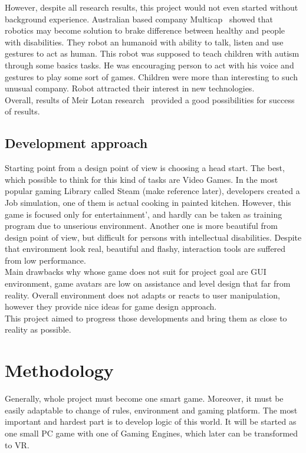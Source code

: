 \documentclass[18pt]{article}
\numberwithin{equation}{section} %
\numberwithin{figure}{section} %
\numberwithin{table}{section} %
\begin{document}
		However, despite all research results, this project would not even started without background experience. Australian based company Multicap~\cite{Multicap} showed that robotics may become solution to brake difference between healthy and people with disabilities. They robot an humanoid with ability to talk, listen and use gestures to act as human. This robot was supposed to teach children with autism through some basics tasks. He was encouraging person to act with his voice and gestures to play some sort of games. Children were more than interesting to such unusual company. Robot attracted their interest in new technologies. \\		
		Overall, results of Meir Lotan research~\cite{LOTAN2009229} provided a good possibilities for success of results.\\	
	
	\subsection{Development approach}
		Starting point from a design point of view is choosing a head start. The best, which possible to think for this kind of tasks are Video Games. In the most popular gaming Library called Steam (make reference later), developers created a Job simulation, one of them is actual cooking in painted kitchen. However, this game is focused only for entertainment', and hardly can be taken as training program due to unserious environment. Another one is more beautiful from design point of view, but difficult for persons with intellectual disabilities. Despite that environment look real, beautiful and flashy, interaction tools are suffered from low performance. \\
		Main drawbacks why whose game does not suit for project goal are GUI environment, game avatars are low on assistance and level design that far from reality. Overall environment does not adapts or reacts to user manipulation, however they provide nice ideas for game design approach. \\
		This project aimed to progress those developments and bring them as close to reality as possible. \\
	
\section{Methodology}	
	Generally, whole project must become one smart game. Moreover, it must be easily adaptable to change of rules, environment and gaming platform. The most important and hardest part is to develop logic of this world. It will be started as one small PC game with one of Gaming Engines, which later can be transformed to VR. \\
	
\end{document}
